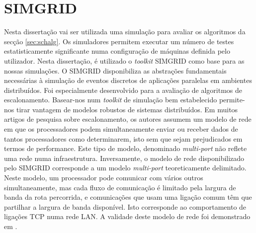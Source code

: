 \section{SIMGRID}
Nesta dissertação vai ser utilizada uma simulação para avaliar os algoritmos da secção \ref{sec:schalg}.
Os simuladores permitem executar um número de testes estatisticamente significante numa configuração de máquinas definida pelo utilizador. Nesta dissertação, é utilizado o \textit{toolkit} SIMGRID \cite{Casanova2008} como base para as nossas simulações.
O SIMGRID disponibiliza as abstrações fundamentais necessárias à simulação de eventos discretos de aplicações paralelas em ambientes distribuídos. Foi especialmente desenvolvido para a avaliação de algoritmos de escalonamento.
Basear-nos num \textit{toolkit} de simulação bem estabelecido permite-nos tirar vantagem de modelos robustos de sistemas distribuídos.
Em muitos artigos de pesquisa sobre escalonamento, os autores assumem um modelo de rede em que os processadores podem simultaneamente enviar ou receber dados de tantos processadores como determinarem, isto sem que sejam prejudicados em termos de performance. Este tipo de modelo, denominado \textit{multi-port} não reflete uma rede numa infraestrutura. Inversamente, o modelo de rede disponibilizado pelo SIMGRID corresponde a um modelo \textit{multi-port} teoreticamente delimitado. Neste modelo, um processador pode comunicar com vários outros simultaneamente, mas cada fluxo de comunicação é limitado pela largura de banda da rota percorrida, e comunicações que usam uma ligação comum têm que partilhar a largura de banda disponível. Isto corresponde ao comportamento de ligações TCP numa rede LAN. A validade deste modelo de rede foi demonstrado em \cite{Velho2009}.



